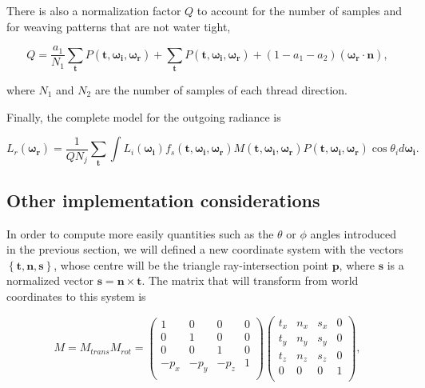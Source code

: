 \documentclass[12pt]{article}
\newcommand{\omegai}{\boldsymbol{\omega_i}}
\newcommand{\omegar}{\boldsymbol{\omega_r}}
\newcommand{\tb}{\mathbf{t}}
\begin{document}
There is also a normalization factor $Q$ to account for the number of samples and for weaving patterns that are not water tight,

\begin{equation}
Q = \frac{a_1}{N_1} \sum_\tb P(\tb, \omegai, \omegar) + \sum_\tb P(\tb, \omegai, \omegar) + (1 - a_1 - a_2)(\omegar \cdot \mathbf{n}),
\end{equation}

where $N_1$ and $N_2$ are the number of samples of each thread direction.

Finally, the complete model for the outgoing radiance is

\begin{equation}
L_{r}(\omegar) = \frac{1}{Q N_j} \sum_\tb \int L_i(\omegai) f_s(\tb, \omegai, \omegar) M(\tb, \omegai, \omegar) P(\tb, \omegai, \omegar)  \cos \theta_i d \omegai.
\end{equation}

\subsection{Other implementation considerations}

In order to compute more easily quantities such as the $\theta$ or $\phi$ angles introduced in the previous section, we will defined a new coordinate system with the vectors $\left\lbrace \tb,\mathbf{n},\mathbf{s} \right\rbrace$, whose centre will be the triangle ray-intersection point $\mathbf{p}$, where $\mathbf{s}$ is a normalized vector $\mathbf{s} = \mathbf{n} \times \tb$.
The matrix that will transform from world coordinates to this system is

\begin{equation}
M = M_{trans}M_{rot} =
\begin{pmatrix}
1 & 0 & 0 & 0 \\
0 & 1 & 0 & 0 \\
0 & 0 & 1 & 0 \\
-p_x & -p_y & -p_z & 1 \\
\end{pmatrix}
\begin{pmatrix}
t_x & n_x & s_x & 0 \\
t_y & n_y & s_y & 0 \\
t_z & n_z & s_z & 0 \\
0 & 0 & 0 & 1 \\
\end{pmatrix},
\end{equation}
\end{document}
